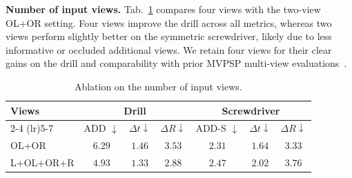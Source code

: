 \noindent\textbf{Number of input views.}
Tab.~\ref{tab:ablation_num_views} compares four views with the two-view OL+OR setting.
Four views improve the drill across all metrics, whereas two views perform
slightly better on the symmetric screwdriver, likely due to less informative
or occluded additional views.
We retain four views for their clear gains on the drill and comparability with
prior MVPSP multi-view evaluations~\cite{haugaard2023episurfemb}.


\begin{table}[H]
\centering
\caption{Ablation on the number of input views.}
\label{tab:ablation_num_views}
\small
\setlength{\tabcolsep}{4.5pt}
\begin{tabular*}{\linewidth}{@{\extracolsep{\fill}}lcccccc@{}}
\toprule
\multirow{2}{*}{Views}
&
\multicolumn{3}{c}{Drill}
&
\multicolumn{3}{c}{Screwdriver}
\\
\cmidrule(lr){2-4}
\cmidrule(lr){5-7}
&
ADD \(\downarrow\)
&
\(\Delta t \downarrow\)
&
\(\Delta R \downarrow\)
&
ADD-S \(\downarrow\)
&
\(\Delta t \downarrow\)
&
\(\Delta R \downarrow\)
\\
\midrule
OL+OR
& \(6.29\)
& \(1.46\)
& \(3.53\)
& \(\mathbf{2.31}\)
& \(\mathbf{1.64}\)
& \(\mathbf{3.33}\)
\\
L+OL+OR+R
& \(\mathbf{4.93}\)
& \(\mathbf{1.33}\)
& \(\mathbf{2.88}\)
& \(2.47\)
& \(2.02\)
& \(3.76\)
\\
\bottomrule
\end{tabular*}
\end{table}